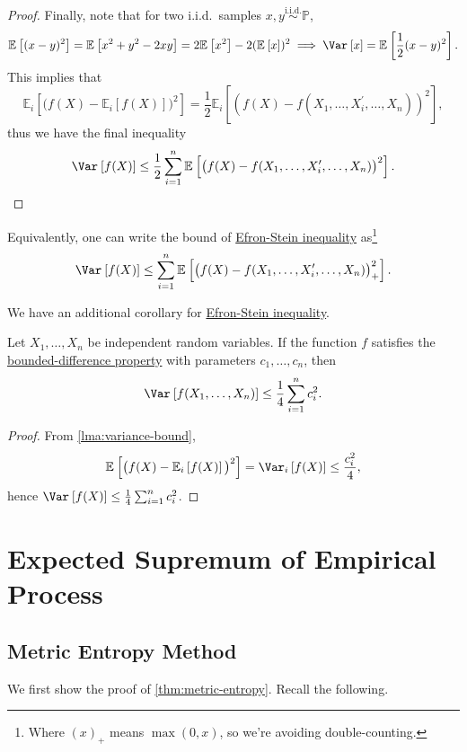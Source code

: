 \begin{proof}
	Finally, note that for two i.i.d.\ samples \(x, y \overset{\text{i.i.d.} }{\sim } \mathbb{P} \),
	\[
		\mathbb{E}_{}\left[(x-y)^2 \right] = \mathbb{E}_{}\left[x^2 + y^2 - 2xy \right] = 2 \mathbb{E}_{}\left[x^2 \right] - 2(\mathbb{E}_{}\left[x \right] )^2
		\implies \Var_{}\left[x \right] = \mathbb{E}_{}\left[\frac{1}{2}(x-y)^2 \right].
	\]
	This implies that
	\[
		\mathbb{E}_{i}\left[\big(f(X) - \mathbb{E}_{i}\left[f(X) \right] \big)^2 \right]
		= \frac{1}{2} \mathbb{E}_{i}\left[(f(X) - f(X_1, \dots , X_i^{\prime} , \dots , X_n))^2 \right] ,
	\]
	thus we have the final inequality
	\[
		\Var_{}\left[f(X) \right]
		\leq \frac{1}{2}\sum_{i=1}^{n} \mathbb{E}_{}\left[\big( f(X) - f(X_1, \dots , X_i^{\prime} , \dots , X_n) \big)^2 \right].
	\]
\end{proof}

\begin{remark}
	Equivalently, one can write the bound of \hyperref[thm:Efron-Stein-inequality]{Efron-Stein inequality} as\footnote{Where \((x)_+\) means \(\max (0, x)\), so we're avoiding double-counting.}
	\[
		\Var_{}\left[f(X) \right]
		\leq \sum_{i=1}^{n} \mathbb{E}_{}\left[\big( f(X) - f(X_1, \dots , X_i^{\prime} , \dots , X_n) \big)_+^2 \right].
	\]
\end{remark}

We have an additional corollary for \hyperref[thm:Efron-Stein-inequality]{Efron-Stein inequality}.

\begin{corollary}
	Let \(X_1, \dots , X_n\) be independent random variables. If the function \(f\) satisfies the \hyperref[def:bounded-difference-property]{bounded-difference property} with parameters \(c_1, \dots , c_n\), then
	\[
		\Var_{}\left[f(X_1, \dots , X_n) \right] \leq \frac{1}{4} \sum_{i=1}^{n} c_i^2.
	\]
\end{corollary}
\begin{proof}
	From \autoref{lma:variance-bound},
	\[
		\mathbb{E}_{}\left[\big(f(X) - \mathbb{E}_{i}\left[f(X) \right] \big)^2\right]
		= \Var_{i}\left[f(X) \right]
		\leq \frac{c_i^2}{4},
	\]
	hence \(\Var_{}\left[f(X) \right] \leq \frac{1}{4}\sum_{i=1}^{n} c_i^2\).
\end{proof}

\section{Expected Supremum of Empirical Process}
\subsection{Metric Entropy Method}
We first show the proof of \autoref{thm:metric-entropy}. Recall the following.

